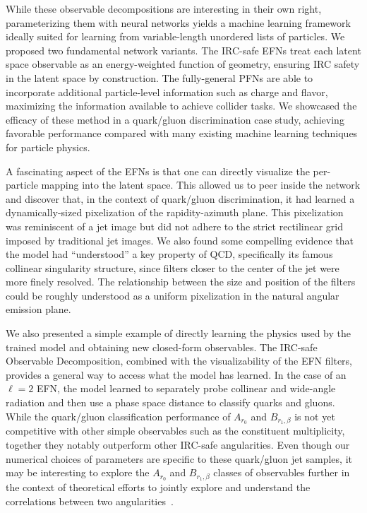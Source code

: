 \documentclass[letterpaper,11pt]{article}
\begin{document}
While these observable decompositions are interesting in their own right, parameterizing them with neural networks yields a machine learning framework ideally suited for learning from variable-length unordered lists of particles.
%
We proposed two fundamental network variants.
%
The IRC-safe EFNs treat each latent space observable as an energy-weighted function of geometry, ensuring IRC safety in the latent space by construction.
%
The fully-general PFNs are able to incorporate additional particle-level information such as charge and flavor, maximizing the information available to achieve collider tasks.
%
We showcased the efficacy of these method in a quark/gluon discrimination case study, achieving favorable performance compared with many existing machine learning techniques for particle physics.



A fascinating aspect of the EFNs is that one can directly visualize the per-particle mapping into the latent space.
%
This allowed us to peer inside the network and discover that, in the context of quark/gluon discrimination, it had learned a dynamically-sized pixelization of the rapidity-azimuth plane.
%
This pixelization was reminiscent of a jet image but did not adhere to the strict rectilinear grid imposed by traditional jet images.
%
We also found some compelling evidence that the model had ``understood'' a key property of QCD, specifically its famous collinear singularity structure, since filters closer to the center of the jet were more finely resolved.
%
The relationship between the size and position of the filters could be roughly understood as a uniform pixelization in the natural angular emission plane.


We also presented a simple example of directly learning the physics used by the trained model and obtaining new closed-form observables.
%
The IRC-safe Observable Decomposition, combined with the visualizability of the EFN filters, provides a general way to access what the model has learned.
%
In the case of an $\ell = 2$ EFN, the model learned to separately probe collinear and wide-angle radiation and then use a phase space distance to classify quarks and gluons.
%
While the quark/gluon classification performance of $A_{r_0}$ and $B_{r_1,\beta}$ is not yet competitive with other simple observables such as the constituent multiplicity, together they notably outperform other IRC-safe angularities.
%
Even though our numerical choices of parameters are specific to these quark/gluon jet samples, it may be interesting to explore the $A_{r_0}$ and $B_{r_1,\beta}$ classes of observables further in the context of theoretical efforts to jointly explore and understand the correlations between two angularities~\cite{Larkoski:2014pca,Larkoski:2014tva,Procura:2018zpn}.
\end{document}

